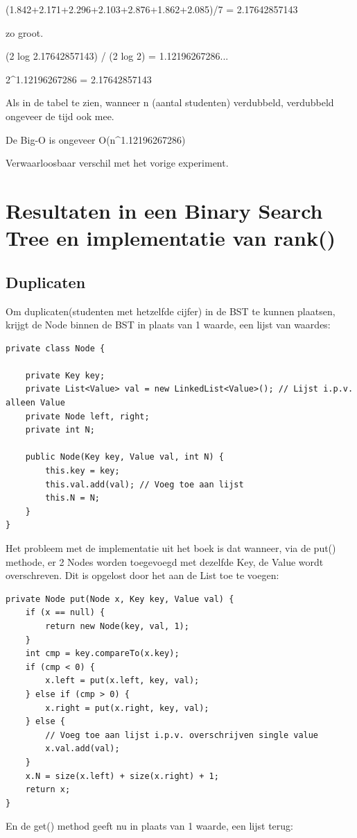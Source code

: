 \documentclass[12pt,notitlepage]{article}
\begin{document}
(1.842+2.171+2.296+2.103+2.876+1.862+2.085)/7 = 2.17642857143

zo groot.

(2 log 2.17642857143) / (2 log 2) = 1.12196267286...

2^{1.12196267286} = 2.17642857143

Als in de tabel te zien, wanneer n (aantal studenten) verdubbeld, verdubbeld ongeveer de tijd ook mee.

De Big-O is ongeveer O(n^{1.12196267286})

Verwaarloosbaar verschil met het vorige experiment.

\clearpage
\section{Resultaten in een Binary Search Tree en implementatie van rank()}

\subsection{Duplicaten}
Om duplicaten(studenten met hetzelfde cijfer) in de BST te kunnen plaatsen, krijgt de Node binnen de BST in plaats van 1 waarde, een lijst van waardes:

\begin{lstlisting}
private class Node {

    private Key key;
    private List<Value> val = new LinkedList<Value>(); // Lijst i.p.v. alleen Value
    private Node left, right;
    private int N;

    public Node(Key key, Value val, int N) {
        this.key = key;
        this.val.add(val); // Voeg toe aan lijst
        this.N = N;
    }
}
\end{lstlisting}

Het probleem met de implementatie uit het boek is dat wanneer, via de put() methode, er 2 Nodes worden toegevoegd met dezelfde Key, de Value wordt overschreven. Dit is opgelost door het aan de List toe te voegen:

\begin{lstlisting}
private Node put(Node x, Key key, Value val) {
    if (x == null) {
        return new Node(key, val, 1);
    }
    int cmp = key.compareTo(x.key);
    if (cmp < 0) {
        x.left = put(x.left, key, val);
    } else if (cmp > 0) {
        x.right = put(x.right, key, val);
    } else {
        // Voeg toe aan lijst i.p.v. overschrijven single value
        x.val.add(val); 
    }
    x.N = size(x.left) + size(x.right) + 1;
    return x;
}
\end{lstlisting}
\clearpage
En de get() method geeft nu in plaats van 1 waarde, een lijst terug:
\end{document}
